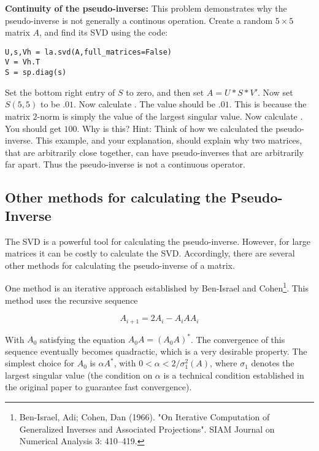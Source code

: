 \begin{problem}
{\bf Continuity of the pseudo-inverse:} This problem demonstrates why the pseudo-inverse is not generally a continous operation. Create a random $5 \times 5$ matrix $A$, and find its SVD using the code:
\begin{lstlisting}
U,s,Vh = la.svd(A,full_matrices=False)
V = Vh.T
S = sp.diag(s)
\end{lstlisting}
Set the bottom right entry of $S$ to zero, and then set $A = U*S*V'$. Now set $S(5,5)$ to be $.01$. Now calculate . The value should be $.01$. This is because the matrix $2$-norm is simply the value of the largest singular value. Now calculate . You should get $100$. Why is this? Hint: Think of how we calculated the pseudo-inverse. This example, and your explanation, should explain why two matrices, that are arbitrarily close together, can have pseudo-inverses that are arbitrarily far apart. Thus the pseudo-inverse is not a continuous operator.
\end{problem}

\subsection*{Other methods for calculating the Pseudo-Inverse}

The SVD is a powerful tool for calculating the pseudo-inverse. However, for large matrices it can be costly to calculate the SVD. Accordingly, there are several other methods for calculating the pseudo-inverse of a matrix.

One method is an iterative approach established by Ben-Israel and Cohen\footnote{Ben-Israel, Adi; Cohen, Dan (1966). "On Iterative Computation of Generalized Inverses and Associated Projections". SIAM Journal on Numerical Analysis 3: 410–419.}. This method uses the recursive sequence

\[
A_{i+1} = 2A_i - A_i A A_i
\]

With $A_0$ satisfying the equation $A_0 A = (A_0 A)^*$. The convergence of this sequence eventually becomes quadractic, which is a very desirable property. The simplest choice for $A_0$ is $\alpha A^*$, with $0 < \alpha < 2/\sigma_1^2(A)$, where $\sigma_1$ denotes the largest singular value (the condition on $\alpha$ is a technical condition established in the original paper to guarantee fast convergence).

